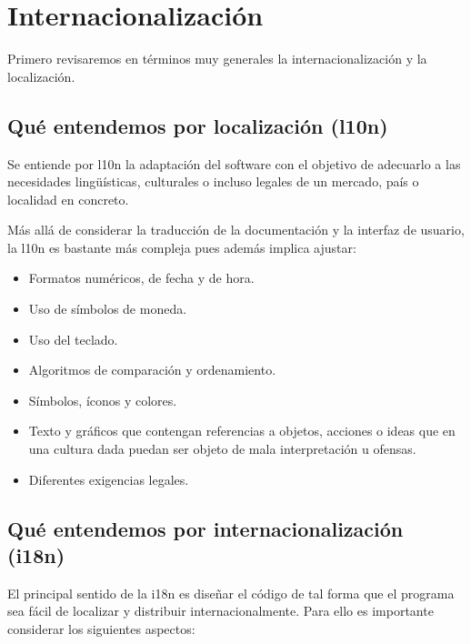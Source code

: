 
\section{Internacionalización}\label{i18n:internacionalizacion}

Primero revisaremos en términos muy generales la internacionalización y la localización.

\subsection{Qué entendemos por localización (l10n)}\label{i18n:que-entendemos-l10n}
Se entiende por l10n la adaptación del software con el objetivo de adecuarlo a las necesidades lingüísticas, culturales o incluso legales de un mercado, país o localidad en concreto.

Más allá de considerar la traducción de la documentación y la interfaz de usuario, la l10n es bastante más compleja pues además implica ajustar:
\begin{itemize}
	\item Formatos numéricos, de fecha y de hora.
	\item Uso de símbolos de moneda.
	\item Uso del teclado.
	\item Algoritmos de comparación y ordenamiento.
	\item Símbolos, íconos y colores.
	\item Texto y gráficos que contengan referencias a objetos, acciones o ideas que en una cultura dada puedan ser objeto de mala interpretación u ofensas.
	\item Diferentes exigencias legales.
\end{itemize}

\subsection{Qué entendemos por internacionalización (i18n)}\label{i18n:que-entendemos-i18n}

El principal sentido de la i18n es diseñar el código de tal forma que el programa sea fácil de localizar y distribuir internacionalmente. Para ello es importante considerar los siguientes aspectos:


